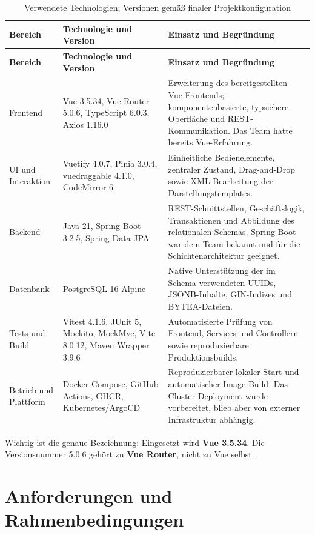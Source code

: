 \documentclass[11pt,a4paper]{article}
\begin{document}
\begin{longtable}{|p{.18\linewidth}|p{.28\linewidth}|p{.45\linewidth}|}
\caption{Verwendete Technologien; Versionen gemäß finaler Projektkonfiguration}
\label{tab:tech}\\
\hline
\textbf{Bereich}&\textbf{Technologie und Version}&\textbf{Einsatz und Begründung}\\
\hline
\endfirsthead
\hline
\textbf{Bereich}&\textbf{Technologie und Version}&\textbf{Einsatz und Begründung}\\
\hline
\endhead
Frontend&Vue 3.5.34, Vue Router 5.0.6, TypeScript 6.0.3, Axios 1.16.0&
Erweiterung des bereitgestellten Vue-Frontends; komponentenbasierte,
typsichere Oberfläche und REST-Kommunikation. Das Team hatte bereits
Vue-Erfahrung.\\
UI und Interaktion&Vuetify 4.0.7, Pinia 3.0.4, vuedraggable 4.1.0,
CodeMirror 6&Einheitliche Bedienelemente, zentraler Zustand, Drag-and-Drop
sowie XML-Bearbeitung der Darstellungstemplates.\\
Backend&Java 21, Spring Boot 3.2.5, Spring Data JPA&REST-Schnittstellen,
Geschäftslogik, Transaktionen und Abbildung des relationalen Schemas. Spring
Boot war dem Team bekannt und für die Schichtenarchitektur geeignet.\\
Datenbank&PostgreSQL 16 Alpine&Native Unterstützung der im Schema verwendeten
UUIDs, JSONB-Inhalte, GIN-Indizes und BYTEA-Dateien.\\
Tests und Build&Vitest 4.1.6, JUnit 5, Mockito, MockMvc, Vite 8.0.12,
Maven Wrapper 3.9.6&Automatisierte Prüfung von Frontend, Services und
Controllern sowie reproduzierbare Produktionsbuilds.\\
Betrieb und Plattform&Docker Compose, GitHub Actions, GHCR, Kubernetes/ArgoCD&
Reproduzierbarer lokaler Start und automatischer Image-Build. Das
Cluster-Deployment wurde vorbereitet, blieb aber von externer Infrastruktur
abhängig.\\
\hline
\end{longtable}

Wichtig ist die genaue Bezeichnung: Eingesetzt wird \textbf{Vue 3.5.34}.
Die Versionsnummer 5.0.6 gehört zu \textbf{Vue Router}, nicht zu Vue selbst.

\section{Anforderungen und Rahmenbedingungen}
\end{document}
